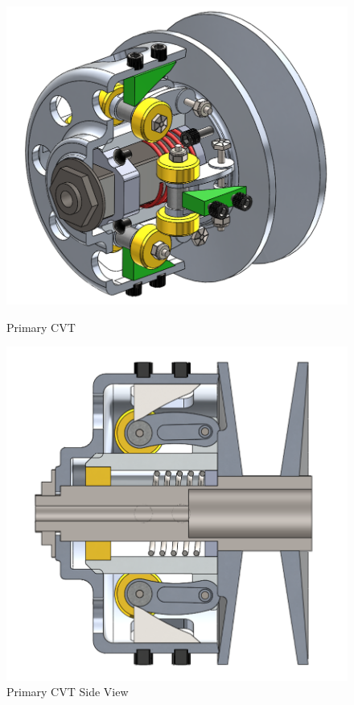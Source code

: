 \documentclass[12pt]{article}
\begin{document}
\begin{figure}[H]
  \begin{center}
      \begin{minipage}{0.45\textwidth}
          \includegraphics[scale=0.5]{primaryCVT.png}
          \caption{Primary CVT}
          \label{Fig_PrimaryCVT}
      \end{minipage}
      \hfill %
      \begin{minipage}{0.45\textwidth}
          \includegraphics[scale=0.5]{primaryCVTSideView.png}
          \caption{Primary CVT Side View}
          \label{Fig_PrimaryCVTSideView}
      \end{minipage}
  \end{center}
\end{figure}
\end{document}
